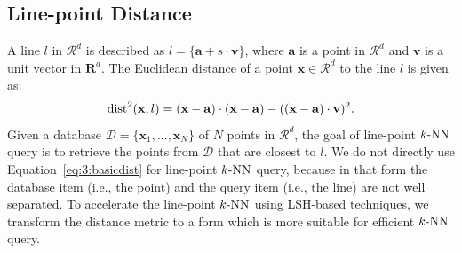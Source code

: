 \subsection{Line-point Distance}
A line $l$ in $\mathcal R^d$ is described as $l = \{\mathbf a + s \cdot \mathbf v\}$, where $\mathbf a$ is a point in $\mathcal R^d$ and $\mathbf v$ is a unit vector in $\mathbf R^d$.
The Euclidean distance of a point $\mathbf x \in \mathcal R^d$ to the line $l$ is given as:
\begin{equation}
\label{eq:3:basicdist}
  \operatorname{dist}^2(\mathbf x, l) = (\mathbf x - \mathbf a) \cdot (\mathbf x - \mathbf a) - ((\mathbf x - \mathbf a) \cdot \mathbf v)^2.
\end{equation}
Given a database $\mathcal D = \{\mathbf x_1, ..., \mathbf x_N\}$ of $N$ points in $\mathcal R^d$, the goal of line-point $k\text{-NN}$ query is to retrieve the points from $\mathcal D$ that are closest to $l$. We do not directly use Equation~\ref{eq:3:basicdist} for line-point $k\text{-NN}$ query, because in that form the database item (i.e., the point) and the query item (i.e., the line) are not well separated. To accelerate the line-point $k\text{-NN}$ using LSH-based techniques, we transform the distance metric to a form which is more suitable for efficient $k\text{-NN}$ query.

